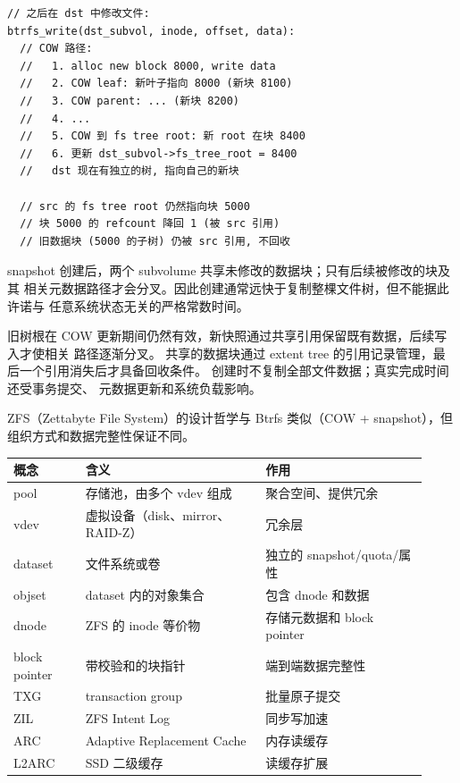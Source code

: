 \begin{filesystemlayout}
\begin{lstlisting}
// 之后在 dst 中修改文件:
btrfs_write(dst_subvol, inode, offset, data):
  // COW 路径:
  //   1. alloc new block 8000, write data
  //   2. COW leaf: 新叶子指向 8000 (新块 8100)
  //   3. COW parent: ... (新块 8200)
  //   4. ...
  //   5. COW 到 fs tree root: 新 root 在块 8400
  //   6. 更新 dst_subvol->fs_tree_root = 8400
  //   dst 现在有独立的树, 指向自己的新块

  // src 的 fs tree root 仍然指向块 5000
  // 块 5000 的 refcount 降回 1 (被 src 引用)
  // 旧数据块 (5000 的子树) 仍被 src 引用, 不回收
\end{lstlisting}

snapshot 创建后，两个 subvolume 共享未修改的数据块；只有后续被修改的块及其
相关元数据路径才会分叉。因此创建通常远快于复制整棵文件树，但不能据此许诺与
任意系统状态无关的严格常数时间。

旧树根在 COW 更新期间仍然有效，新快照通过共享引用保留既有数据，后续写入才使相关
路径逐渐分叉。
共享的数据块通过 extent tree 的引用记录管理，最后一个引用消失后才具备回收条件。
创建时不复制全部文件数据；真实完成时间还受事务提交、
元数据更新和系统负载影响。


ZFS（Zettabyte File System）的设计哲学与 Btrfs 类似（COW + snapshot），但组织方式和数据完整性保证不同。

\begin{longtable}{|F{0.16\linewidth}|F{0.40\linewidth}|F{0.36\linewidth}|}
\toprule
{}
概念 & 含义 & 作用 \\
\midrule
pool & 存储池，由多个 vdev 组成 & 聚合空间、提供冗余 \\\tablerowrule
vdev & 虚拟设备（disk、mirror、RAID-Z） & 冗余层 \\\tablerowrule
dataset & 文件系统或卷 & 独立的 snapshot/quota/属性 \\\tablerowrule
objset & dataset 内的对象集合 & 包含 dnode 和数据 \\\tablerowrule
dnode & ZFS 的 inode 等价物 & 存储元数据和 block pointer \\\tablerowrule
block pointer & 带校验和的块指针 & 端到端数据完整性 \\\tablerowrule
TXG & transaction group & 批量原子提交 \\\tablerowrule
ZIL & ZFS Intent Log & 同步写加速 \\\tablerowrule
ARC & Adaptive Replacement Cache & 内存读缓存 \\\tablerowrule
L2ARC & SSD 二级缓存 & 读缓存扩展 \\
\bottomrule
\end{longtable}


\end{filesystemlayout}
